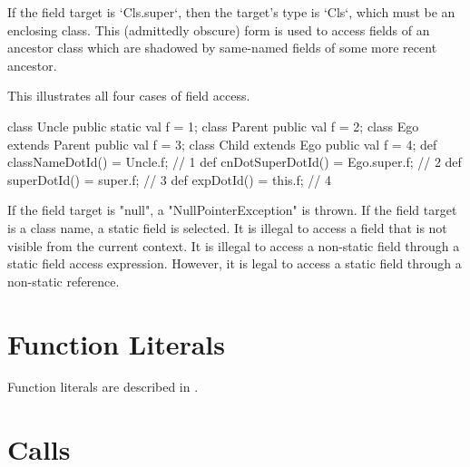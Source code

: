 If the field target is \xcd`Cls.super`, then the target's type is \xcd`Cls`,
which must be an  enclosing class.  This (admittedly
obscure) form is used to access fields of an ancestor class which are shadowed
by same-named fields of some more recent ancestor.  

\begin{ex}
This illustrates all four cases of field access.
\begin{xten}
class Uncle {
  public static val f = 1;
}
class Parent {
  public val f = 2;
}
class Ego extends Parent {
  public val f = 3;
  class Child extends Ego {
     public val f = 4;
     def classNameDotId() =  Uncle.f;     // 1
     def cnDotSuperDotId() = Ego.super.f; // 2
     def superDotId() =      super.f;     // 3
     def expDotId() =        this.f;      // 4
  }
}
\end{xten}
%
\end{ex}

If the field target is \xcd"null", a \xcd"NullPointerException"
is thrown.
If the field target is a class name, a static field is selected.
It is illegal to access  a field that is not visible from
the current context.
It is illegal to access a non-static field
through a static field access expression.  However, it is legal to access a
static field through a non-static reference.

\section{Function Literals}
Function literals are described in .

\section{Calls}
\label{Call}
\label{MethodInvocation}
\label{MethodInvocationSubstitution}


